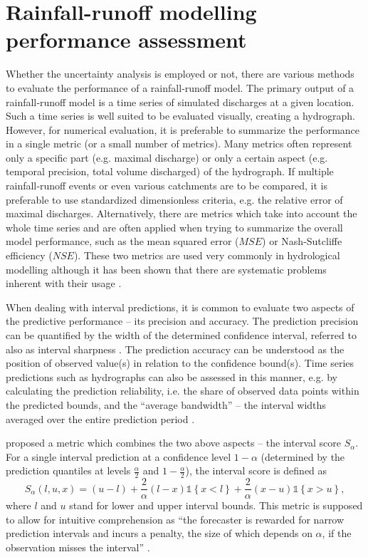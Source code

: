 \documentclass{ctuthesis}\usepackage[]{graphicx}\usepackage[]{color}
\begin{document}
\section{Rainfall-runoff modelling performance assessment} \label{PerAsses} 

Whether the uncertainty analysis is employed or not, there are various methods to evaluate the
performance of a rainfall‐runoff model. The primary output of a rainfall‐runoff model is a time series of simulated discharges at a given location. Such a time series is well suited to be evaluated visually, creating a hydrograph. However, for numerical evaluation, it is preferable to summarize the performance in a single metric (or a small number of metrics). Many metrics often represent only a specific part (e.g. maximal discharge) or only a certain aspect (e.g. temporal precision, total volume discharged) of the hydrograph. If multiple rainfall‐runoff events or even various catchments are to be compared, it is preferable to use standardized dimensionless criteria, e.g. the relative error of maximal discharges. Alternatively, there are metrics which take into account the whole time series and are often applied when trying to summarize the overall model performance, such as the mean squared error ($M\!S\!E$) or Nash‐Sutcliffe efficiency ($N\!S\!E$). These two metrics are used very commonly in hydrological modelling although it has been shown that there are systematic problems inherent with their usage \citep{guptaDecompositionMeanSquared2009, hess-15-877-2011}.

When dealing with interval predictions, it is common to evaluate two aspects of the predictive performance -- its precision and accuracy. The prediction precision can be quantified by the width of the determined confidence interval, referred to also as interval sharpness \mbox{\citep[e.g.][]{breinholtFormalStatisticalApproach2012}}. The prediction accuracy can be understood as the position of observed value(s) in relation to the confidence bound(s). Time series predictions such as hydrographs can also  be assessed in this manner, e.g. by calculating the prediction reliability, i.e. the share of observed data points within the predicted bounds, and the \enquote{average bandwidth} --  the interval widths averaged over the entire prediction period \citep{giudice2013improving}.

\cite{gneiting2007strictly} proposed a metric which combines the two above aspects  -- the interval score $S_\alpha$. For a single interval prediction at a confidence level $1-\alpha$ (determined by the prediction quantiles at levels $ \frac{\alpha}{2} $ and $ 1-\frac{\alpha}{2} $), the interval score is defined as
\begin{equation} \label{eq:IS}
S_\alpha(l,u,x) =  ( u - l ) + \frac{2}{\alpha} (l - x)  \mathds{1} \left\{x < l \right\} + \frac{2}{\alpha} (x - u)  \mathds{1} \left\{x > u \right\} ,
\end{equation}
where $l$ and $u$ stand for lower and upper interval bounds. This metric is supposed to allow for intuitive comprehension as \enquote{the forecaster is rewarded for narrow prediction intervals and incurs a penalty, the size of which depends on $\alpha$, if the observation misses the interval} \citep{gneiting2007strictly}.
\end{document}
